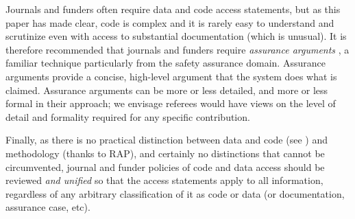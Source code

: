 \documentclass{comjnl}
\begin{document}
Journals and funders often require data and code access statements, but as this paper has made clear, code is complex and it is rarely easy to understand and scrutinize even with access to substantial documentation (which is unusual). It is therefore recommended that journals and funders require \emph{assurance arguments} \cite{assurance-case}, a familiar technique particularly from the safety assurance domain. Assurance arguments provide a concise, high-level argument that the system does what is claimed. Assurance arguments can be more or less detailed, and more or less formal in their approach; we envisage referees would have views on the level of detail and formality required for any specific contribution.

Finally, as there is no practical distinction between data and code (see \supplement) and methodology (thanks to RAP), and certainly no distinctions that cannot be circumvented, journal and funder policies of code and data access should be reviewed \emph{and unified\/} so that the access statements apply to all information, regardless of any arbitrary classification of it as code or data (or documentation, assurance case, etc).
\end{document}
